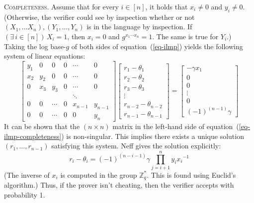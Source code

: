 \documentclass[letter]{article}
\newcommand{\Zmodq}{\mathbb{Z}_q}
\newcommand{\heading}[1]{\noindent \textsc{#1}}
\begin{document}
\heading{Completeness.}
Assume that for every $i \in [n]$, it holds that $x_i \ne 0$ and $y_i \ne 0$.
(Otherwise, the verifier could see by inspection whether or not $(X_1, \ldots
X_n),(Y_1, \ldots, Y_n)$ is in the language by inspection. If $(\exists \, i \in
[n]) \, X_i = 1$, then $x_i = 0$ and $g^{x_1 \cdots x_n} = 1$. The same is true for
$Y_i$.)
Taking the log base-$g$ of both sides of equation~(\ref{eq-ilmp}) yields the
following system of linear equations:
\begin{equation}\label{eq-ilmp-completeness}
  \begin{bmatrix}
    y_1 & 0   & 0      & 0       & \cdots  & 0       \\
    x_2 & y_2 & 0      & 0       & \cdots  & 0       \\
    0   & x_3 & y_3    & 0       & \cdots  & 0       \\
        &     &        &         & \ddots  &         \\
    0   & 0   & \cdots & 0       & x_{n-1} & y_{n-1} \\
    0   & 0   & \cdots & 0       & 0       & y_{n}
  \end{bmatrix}
  \begin{bmatrix}
    r_1 - \theta_1 \\
    r_2 - \theta_2 \\
    r_3 - \theta_3 \\
    \vdots \\
    r_{n-2} - \theta_{n-2} \\
    r_{n-1} - \theta_{n-1}
  \end{bmatrix} =
  \begin{bmatrix}
    -\gamma x_1 \\
    0 \\
    0 \\
    \vdots \\
    0 \\
    (-1)^{(n-1)}\gamma
  \end{bmatrix}
\end{equation}
It can be shown that the $(n \times n)$ matrix in the left-hand side of
equation~(\ref{eq-ilmp-completeness}) is non-singular. This implies there exists
a unique solution $(r_1, \ldots, r_{n-1})$ satisfying this system. Neff gives
the solution explicitly:
\begin{equation} \label{eq-ilmp-findr}
  r_i - \theta_i = (-1)^{(n-i-1)} \gamma \prod_{j=i+1}^n {y_i}{x_i}^{-1}
\end{equation}
(The inverse of $x_i$ is computed in the group $\Zmodq^*$. This is
found using Euclid's algorithm.) Thus, if the prover isn't cheating, then the
verifier accepts with probability 1.
\end{document}
